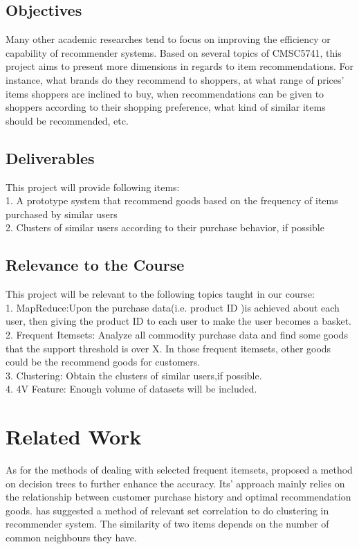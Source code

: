 \documentclass[sigconf,authordraft]{acmart}
\begin{document}
\subsection{Objectives}

Many other academic researches tend to focus on improving the efficiency or capability of recommender systems. Based on several topics of CMSC5741, this project aims to present more dimensions in regards to item recommendations. For instance, what brands do they recommend to shoppers, at what range of prices’ items shoppers are inclined to buy, when recommendations can be given to shoppers according to their shopping preference, what kind of similar items should be recommended, etc. 

\subsection{Deliverables}
This project will provide following items:\\
1.  A prototype system that recommend goods based on the frequency of items purchased by similar users\\
2.  Clusters of similar users according to their purchase behavior, if possible

\subsection{Relevance to the Course}
This project will be relevant to the following topics taught in our course:\\
1. MapReduce:Upon the purchase data(i.e. product ID )is achieved about each user, then giving the product ID to each user to make the user becomes a basket.\\
2. Frequent Itemsets: Analyze all commodity purchase data and find some goods that the support threshold is over X. In those frequent itemsets, other goods could be the recommend goods for customers.\\
3. Clustering: Obtain the clusters of similar users,if possible.\\
4. 4V Feature: Enough volume of datasets will be included.

\section{Related Work}
As for the methods of dealing with selected frequent itemsets, \cite{10.1145/1141277.1141410} proposed a method on decision trees to further enhance the accuracy. Its' approach mainly relies on the relationship between customer purchase history and optimal recommendation goods.\cite{10.1145/1639714.1639799} has suggested a method of relevant set correlation to do clustering in recommender system. The similarity of two items depends on the number of common neighbours they have.
\end{document}
